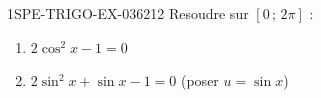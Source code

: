 \begin{exercice}{1SPE-TRIGO-EX-036}{2}{12}
Resoudre sur $[0\,;\,2\pi]$ :
\begin{enumerate}
  \item $2\cos^2 x - 1 = 0$
  \item $2\sin^2 x + \sin x - 1 = 0$ \quad (poser $u = \sin x$)
\end{enumerate}
\end{exercice}
